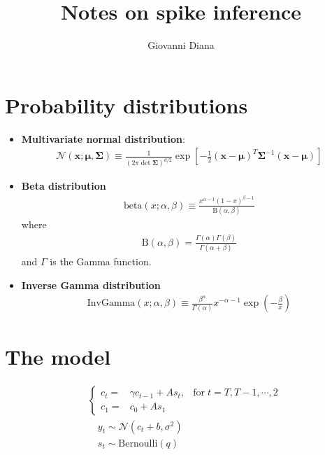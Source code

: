\documentclass{article}
\author{Giovanni Diana}
\title{Notes on spike inference}
\theoremstyle{remark}
\begin{document}
\maketitle
\section{Probability distributions}
\begin{itemize}
    \item {\bf Multivariate normal distribution}:
        \begin{align}
            \mathcal{N}(\bm{x};\bm\mu,\bm\Sigma)\equiv \frac{1}{(2\pi\det\bm\Sigma)^{d/2}}\exp\left[-\frac{1}{2}(\bm x-\bm\mu)^T\bm\Sigma^{-1}(\bm x-\bm\mu)\right]
        \end{align}
    \item {\bf Beta distribution}
        \begin{align}
            \mathrm{beta}(x;\alpha,\beta)\equiv \frac{x^{\alpha-1}(1-x)^{\beta-1}}{\mathrm{B}(\alpha,\beta)}
        \end{align}
        where 
        \begin{align}
            \mathrm{B}(\alpha,\beta)=\frac{\Gamma(\alpha)\Gamma(\beta)}{\Gamma(\alpha+\beta)}
        \end{align}
        and $\Gamma$ is the Gamma function.
    \item {\bf Inverse Gamma distribution}
        \begin{align}
            \mathrm{InvGamma}(x;\alpha,\beta)\equiv \frac{\beta^\alpha}{\Gamma(\alpha)} x^{-\alpha-1}\exp\left(-\frac{\beta}{x}\right)
        \end{align}
\end{itemize}
\section{The model}
\begin{align}
    &\left\lbrace\begin{array}{clc} 
        c_t =& \gamma c_{t-1} + A s_t,& \mathrm{for}\; t=T,T-1,\cdots,2\\
        c_1 =& c_0 + A s_1 &
    \end{array}\right.\\
    &\quad y_t \sim \mathcal{N}(c_t+b,\sigma^2)\\
    &\quad s_t \sim \mathrm{Bernoulli}(q)
\end{align}
\end{document}
